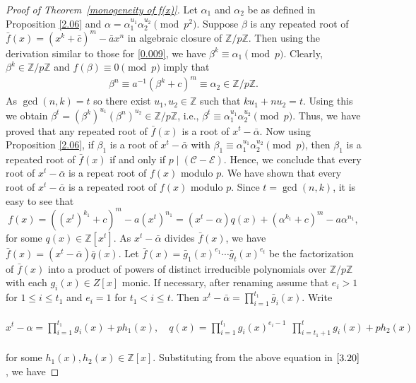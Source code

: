 \documentclass[table]{amsart}
\newcommand{\Z}{\mathbb{Z}}
\newcommand{\calC}{\mathcal{C}}
\newcommand{\calE}{\mathcal{E}}
\numberwithin{equation}{section}
\begin{document}
\begin{proof}[Proof of Theorem~\ref{monogeneity of f(x)}]
	Let $\alpha_1$ and $\alpha_2$ be as defined in Proposition \ref{2.06} and $\alpha = \alpha_1^{u_1} \alpha_2^{u_2} \pmod{p^2}$. Suppose $\beta$ is any repeated root of $\bar f (x)= (x^k+\bar c)^m -\bar a x^n$ in algebraic closure of $\Z/p\Z.$ Then using the derivation similar to those for \eqref{0.009}, we have $\beta^k \equiv \alpha_1 \pmod{p}$. Clearly, $\beta^k \in \Z/p\Z$ and $f(\beta)\equiv 0 \pmod{p}$ imply that
	\begin{align*}
		\beta^n \equiv a^{-1} (\beta^k +c)^m \equiv \alpha_{2} \in {\Z/p\Z}.
	\end{align*}
	As ${\gcd(n,k)}=t$ so there exist $u_1,u_2\in\Z$ such that $ku_1+nu_2=t.$ Using this we obtain $\beta^t = (\beta^k)^{u_1}(\beta^n)^{u_2} \in {\Z/p\Z}$, i.e., $\beta^t \equiv \alpha_1^{u_1} \alpha_{2}^{u_2}\pmod{p}$. Thus, we have proved that any repeated root of $\bar f(x)$ is a root of $ x^t-\bar{\alpha}$. 
	Now using Proposition \ref{2.06}, if $\beta_1$ is a root of $x^t-\bar{\alpha}$  with $\beta_1 \equiv \alpha_1^{u_1} \alpha_{2}^{u_2} \pmod{p}$, then $\beta_1$ is a repeated root of $\bar{f}(x)$ if and only if $p\mid (\calC - \calE)$. Hence, we conclude that every root of $x^t-\bar{\alpha}$ is a repeat root of $f(x)$ modulo $p$. We have shown that every root of $x^t - \bar{\alpha}$ is a repeated root of $f(x)$ modulo $p$.  
Since $t=\gcd(n,k)$, it is easy to see that
	\begin{equation}\label{3.20}
		f(x)= ((x^t)^{k_1}+c)^m -a(x^t)^{n_1} = (x^t-\alpha)q(x) +  (\alpha^{k_1}+c)^m - a \alpha^{n_1},
	\end{equation}
	for some $q(x) \in \Z[x^t]$. As $x^t - \bar{\alpha}$ divides $\bar{f}(x)$, we have $\bar{f}(x) = (x^t-\bar{\alpha})\bar{q}(x)$. Let $\bar{f}(x)=\bar g_1(x)^{e_1}\cdots \bar g_t(x)^{e_t}$ be the factorization of $\bar{f}(x)$ into a product of  powers of distinct irreducible polynomials over $\Z /p\Z$ with each $g_{i}(x)\in Z[x]$ monic. If necessary, after renaming assume that $e_{i}>1$ for $1\leq i\leq t_{1}$ and $e_i=1$ for $t_1< i \leq t$. Then  $x^t-\bar{\alpha}=\prod\limits_{i=1}^{t_1}\bar g_i(x)$. Write\\\\
	$x^t-\alpha=\prod\limits_{i=1}^{t_1} g_i(x)+ph_1(x), \quad q(x)=\prod\limits_{i=1}^{t_1}g_i(x)^{e_i-1}~~ \prod\limits_{i=t_1+1}^{t}g_i(x)+ph_2(x)$ \\\\ for some $h_1(x),h_2(x)\in\Z[x]$. Substituting from the above equation in $\eqref{3.20}$, we  have

\end{proof}
\end{document}
